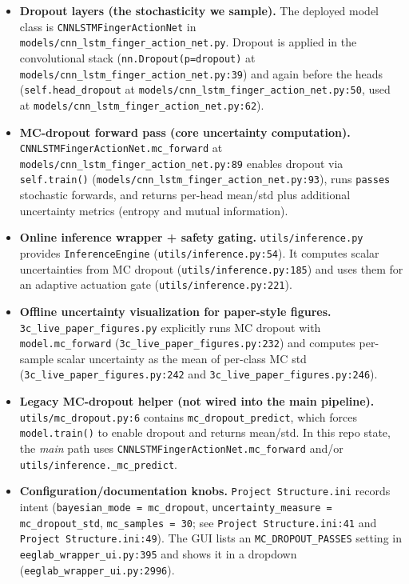 \documentclass[11pt]{article}
\begin{document}
\begin{itemize}
  \item \textbf{Dropout layers (the stochasticity we sample).}
  The deployed model class is \texttt{CNNLSTMFingerActionNet} in \texttt{models/cnn\_lstm\_finger\_action\_net.py}.
  Dropout is applied in the convolutional stack (\texttt{nn.Dropout(p=dropout)} at \texttt{models/cnn\_lstm\_finger\_action\_net.py:39}) and again before the heads (\texttt{self.head\_dropout} at \texttt{models/cnn\_lstm\_finger\_action\_net.py:50}, used at \texttt{models/cnn\_lstm\_finger\_action\_net.py:62}).

  \item \textbf{MC-dropout forward pass (core uncertainty computation).}
  \texttt{CNNLSTMFingerActionNet.mc\_forward} at \texttt{models/cnn\_lstm\_finger\_action\_net.py:89} enables dropout via \texttt{self.train()} (\texttt{models/cnn\_lstm\_finger\_action\_net.py:93}), runs \texttt{passes} stochastic forwards, and returns per-head mean/std plus additional uncertainty metrics (entropy and mutual information).

  \item \textbf{Online inference wrapper + safety gating.}
  \texttt{utils/inference.py} provides \texttt{InferenceEngine} (\texttt{utils/inference.py:54}).
  It computes scalar uncertainties from MC dropout (\texttt{utils/inference.py:185}) and uses them for an adaptive actuation gate (\texttt{utils/inference.py:221}).

  \item \textbf{Offline uncertainty visualization for paper-style figures.}
  \texttt{3c\_live\_paper\_figures.py} explicitly runs MC dropout with \texttt{model.mc\_forward} (\texttt{3c\_live\_paper\_figures.py:232}) and computes per-sample scalar uncertainty as the mean of per-class MC std (\texttt{3c\_live\_paper\_figures.py:242} and \texttt{3c\_live\_paper\_figures.py:246}).

  \item \textbf{Legacy MC-dropout helper (not wired into the main pipeline).}
  \texttt{utils/mc\_dropout.py:6} contains \texttt{mc\_dropout\_predict}, which forces \texttt{model.train()} to enable dropout and returns mean/std.
  In this repo state, the \emph{main} path uses \texttt{CNNLSTMFingerActionNet.mc\_forward} and/or \texttt{utils/inference.\_mc\_predict}.

  \item \textbf{Configuration/documentation knobs.}
  \texttt{Project Structure.ini} records intent (\texttt{bayesian\_mode = mc\_dropout}, \texttt{uncertainty\_measure = mc\_dropout\_std}, \texttt{mc\_samples = 30}; see \texttt{Project Structure.ini:41} and \texttt{Project Structure.ini:49}).
  The GUI lists an \texttt{MC\_DROPOUT\_PASSES} setting in \texttt{eeglab\_wrapper\_ui.py:395} and shows it in a dropdown (\texttt{eeglab\_wrapper\_ui.py:2996}).
\end{itemize}
\end{document}
